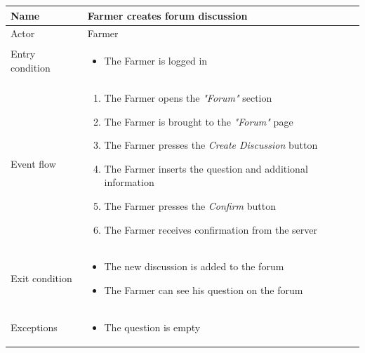 \begin{table}[H]
    \begin{tabu} to \textwidth {|X|X[4]|}
        \hline
        Name            & Farmer creates forum discussion  \\ \hline
        Actor           & Farmer                      \\ \hline
        Entry condition & \begin{itemize}
            \item The Farmer is logged in
        \end{itemize} \\ \hline
        Event flow      & \begin{enumerate}
            \item The Farmer opens the \emph{"Forum"} section
            \item The Farmer is brought to the \emph{"Forum"} page 
            \item The Farmer presses the \emph{Create Discussion} button
            \item The Farmer inserts the question and additional information
            \item The Farmer presses the \emph{Confirm} button
            \item The Farmer receives confirmation from the server
        \end{enumerate} \\ \hline
        Exit condition  & \begin{itemize}
            \item The new discussion is added to the forum
            \item The Farmer can see his question on the forum
        \end{itemize} \\ \hline
        Exceptions      & \begin{itemize}
            \item The question is empty
        \end{itemize} \\ \hline
    \end{tabu}
\end{table}

